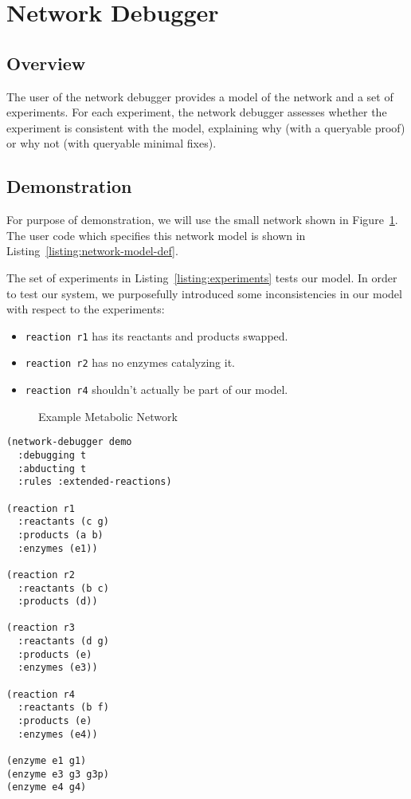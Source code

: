 \section{Network Debugger}
\subsection{Overview}

The user of the network debugger provides a model of the network and a
set of experiments. For each experiment, the network debugger assesses
whether the experiment is consistent with the model, explaining why
(with a queryable proof) or why not (with queryable minimal fixes).

\subsection{Demonstration}

For purpose of demonstration, we will use the small network shown in Figure~\ref{figure:network}.
The user code which specifies this network model is shown in Listing~\ref{listing:network-model-def}.

The set of experiments in Listing~\ref{listing:experiments} tests our
model. In order to test our system, we purposefully introduced some
inconsistencies in our model with respect to the experiments:
\begin{itemize}
\item {\small\tt reaction r1} has its reactants and products swapped.
\item {\small\tt reaction r2} has no enzymes catalyzing it.
\item {\small\tt reaction r4} shouldn't actually be part of our model.
\end{itemize}

\begin{figure}[htb]
\centering
{}
\caption{\label{figure:network} Example Metabolic Network}
\end{figure}

\begin{lstlisting}[label={listing:network-model-def},caption={Network Model}]
(network-debugger demo 
  :debugging t 
  :abducting t 
  :rules :extended-reactions)

(reaction r1 
  :reactants (c g) 
  :products (a b) 
  :enzymes (e1))

(reaction r2 
  :reactants (b c) 
  :products (d))

(reaction r3 
  :reactants (d g) 
  :products (e) 
  :enzymes (e3))

(reaction r4 
  :reactants (b f) 
  :products (e) 
  :enzymes (e4))

(enzyme e1 g1)
(enzyme e3 g3 g3p)
(enzyme e4 g4)
\end{lstlisting}


